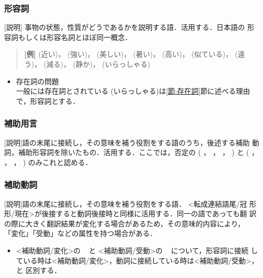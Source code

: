 \subsubsection{形容詞}
[説明] 事物の状態，性質がどうであるかを説明する語．活用する．日本語の
形容詞もしくは形容名詞とほぼ同一概念．

\begin{quote}
{\bf [例]} 
(近い)，
(強い)，
(美しい)，
(暑い)，
(高い)，
(似ている)，
(違う)，
(減る)，
(静か)，
(いらっしゃる)
\end{quote}

\begin{itemize}
\item 存在詞の問題\\
一般には存在詞とされている 
(いらっしゃる)は\ref{節:存在詞}節に述べる理由で，形容詞とする．
\end{itemize}



\subsubsection{補助用言}        
[説明]語の末尾に接続し，その意味を補う役割をする語のうち，後述する補助
動詞，補助形容詞を除いたもの．活用する．ここでは，否定の
(
，
，
，
) 
 と 
(
，
，
，
) 
 のみこれと認める．
        
\subsubsection{補助動詞}        
[説明]語の末尾に接続し，その意味を補う役割をする語．
<転成連結語尾/冠
形形/現在>が後接すると動詞後接時と同様に活用する．同一の語であっても翻
訳の際に大きく翻訳結果が変化する場合があるため，その意味的内容により，
「変化」「受動」などの属性を持つ場合がある．

\begin{itemize}
\item 
<補助動詞/変化>の
\ 
 と <補助動詞/受動>の
\ 
について，形容詞に接続
している時は<補助動詞/変化>，動詞に接続している時は<補助動詞/受動>，と
区別する．

\end{itemize}


